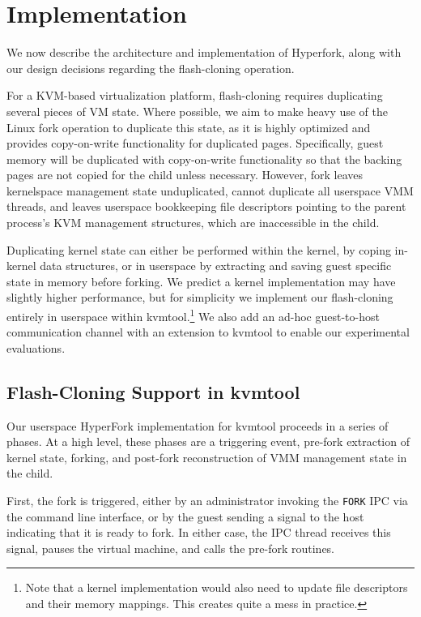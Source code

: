
\section{Implementation} \label{sec:implementation}

We now describe the architecture and implementation of Hyperfork, along with
our design decisions regarding the flash-cloning operation.

For a KVM-based virtualization platform, flash-cloning requires duplicating
several pieces of VM state. Where possible, we aim to make heavy use of the
Linux fork operation to duplicate this state, as it is highly optimized and
provides copy-on-write functionality for duplicated pages. Specifically, guest
memory will be duplicated with copy-on-write functionality so that the backing
pages are not copied for the child unless necessary. However, fork leaves
kernelspace management state unduplicated, cannot duplicate all userspace VMM
threads, and leaves userspace bookkeeping file descriptors pointing to the
parent process's KVM management structures, which are inaccessible in the
child.

Duplicating kernel state can either be performed within the kernel, by
coping in-kernel data structures, or in userspace by extracting and saving
guest specific state in memory before forking. We predict a kernel
implementation may have slightly higher performance, but for simplicity we
implement our flash-cloning entirely in userspace within kvmtool.\footnote{Note
that a kernel implementation would also need to update file descriptors and
their memory mappings. This creates quite a mess in practice.} We also add an
ad-hoc guest-to-host communication channel with an extension to kvmtool to
enable our experimental evaluations.

\subsection{Flash-Cloning Support in kvmtool}

Our userspace HyperFork implementation for kvmtool proceeds in a series of
phases. At a high level, these phases are a triggering event, pre-fork
extraction of kernel state, forking, and post-fork reconstruction of VMM
management state in the child.

First, the fork is triggered, either by an administrator invoking the
\texttt{FORK} IPC via the command line interface, or by the guest sending a
signal to the host indicating that it is ready to fork. In either case, the IPC
thread receives this signal, pauses the virtual machine, and calls the pre-fork
routines.

